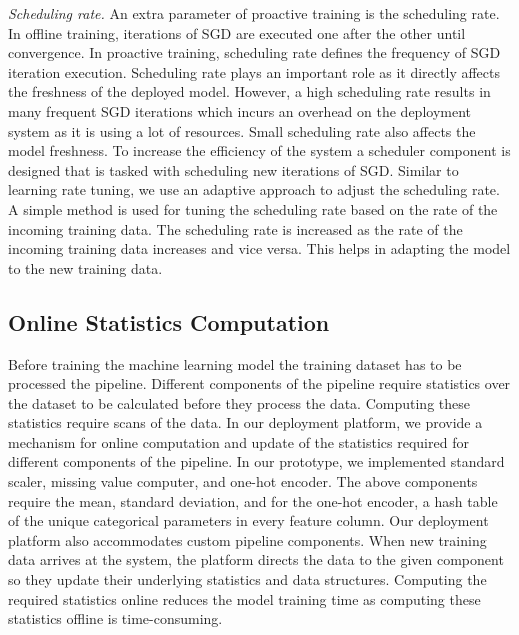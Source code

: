 \textit{Scheduling rate.}
An extra parameter of proactive training is the scheduling rate.
In offline training, iterations of SGD are executed one after the other until convergence.
In proactive training, scheduling rate defines the frequency of SGD iteration execution.
Scheduling rate plays an important role as it directly affects the freshness of the deployed model.
However, a high scheduling rate results in many frequent SGD iterations which incurs an overhead on the deployment system as it is using a lot of resources.
Small scheduling rate also affects the model freshness.
To increase the efficiency of the system a scheduler component is designed that is tasked with scheduling new iterations of SGD.
Similar to learning rate tuning, we use an adaptive approach to adjust the scheduling rate.
A simple method is used for tuning the scheduling rate based on the rate of the incoming training data.
The scheduling rate is increased as the rate of the incoming training data increases and vice versa.
This helps in adapting the model to the new training data.

\subsection{Online Statistics Computation}
Before training the machine learning model the training dataset has to be processed the pipeline.
Different components of the pipeline require statistics over the dataset to be calculated before they process the data.
Computing these statistics require scans of the data.
In our deployment platform, we provide a mechanism for online computation and update of the statistics required for different components of the pipeline.
In our prototype, we implemented standard scaler, missing value computer, and one-hot encoder.
The above components require the mean, standard deviation, and for the one-hot encoder, a hash table of the unique categorical parameters in every feature column.
Our deployment platform also accommodates custom pipeline components.
When new training data arrives at the system, the platform directs the data to the given component so they update their underlying statistics and data structures.
Computing the required statistics online reduces the model training time as computing these statistics offline is time-consuming.

